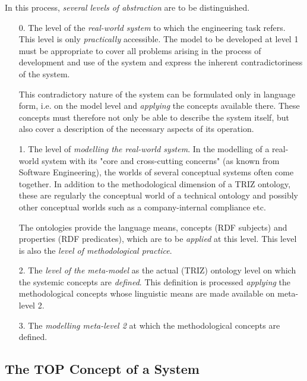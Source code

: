 \documentclass[11pt,a4paper]{article}
\begin{document}
In this process, \emph{several levels of abstraction} are to be distinguished.
\begin{itemize}[noitemsep]
\item [0.] The level of the \emph{real-world system} to which the engineering
  task refers. This level is only \emph{practically} accessible. The model to
  be developed at level 1 must be appropriate to cover all problems arising in
  the process of development and use of the system and express the inherent
  contradictoriness of the system.

  This contradictory nature of the system can be formulated only in language
  form, i.e. on the model level and \emph{applying} the concepts available
  there.  These concepts must therefore not only be able to describe the
  system itself, but also cover a description of the necessary aspects of its
  operation.
\item[1.] The level of \emph{modelling the real-world system}. In the
  modelling of a real-world system with its "core and cross-cutting concerns"
  (as known from Software Engineering), the worlds of several conceptual
  systems often come together. In addition to the methodological dimension of
  a TRIZ ontology, these are regularly the conceptual world of a technical
  ontology and possibly other conceptual worlds such as a company-internal
  compliance etc.

  The ontologies provide the language means, concepts (RDF subjects) and
  properties (RDF predicates), which are to be \emph{applied} at this level.
  This level is also the \emph{level of methodological practice}.
\item[2.] The \emph{level of the meta-model} as the actual (TRIZ) ontology
  level on which the systemic concepts are \emph{defined}. This definition is
  processed \emph{applying} the methodological concepts whose linguistic means
  are made available on meta-level 2.
\item [3.] The \emph{modelling meta-level 2} at which the methodological
  concepts are defined.
\end{itemize}

\subsection{The TOP Concept of a System}
\end{document}
